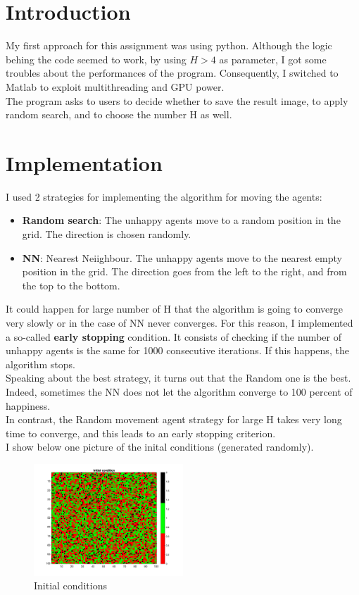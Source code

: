 \documentclass[unicode,11pt,a4paper,oneside,numbers=endperiod,openany]{scrartcl}
\begin{document}
\setassignment

\newline
\section*{Introduction}
My first approach for this assignment was using python. 
Although the logic behing the code seemed to work, by using $H>4$ as parameter, I got some 
troubles about the performances of the program. Consequently, I switched to Matlab to exploit multithreading and GPU power. \\
The program asks to users to decide whether to save the result image, to apply random search, and to choose the number H as well. 
\section*{Implementation}
I used 2 strategies for implementing the algorithm for moving the agents:
\begin{itemize}
    \item \textbf{Random search}: The unhappy agents move to a random position in the grid. The direction is chosen randomly. 
    \item \textbf{NN}: Nearest Neiighbour. The unhappy agents move to the nearest empty position in the grid. The direction goes from the left to the right, and from the top to the bottom.
\end{itemize}


It could happen for large number of H that the algorithm is going to converge very slowly or in the case of NN never converges. For this reason, I implemented a so-called \textbf{early stopping} condition. 
It consists of checking if the number of unhappy agents is the same for 1000 consecutive iterations. If this happens, the algorithm stops. \\
Speaking about the best strategy, it turns out that the Random one is the best. Indeed, sometimes the NN does not let the algorithm converge to 100 percent of happiness. \\
In contrast, the Random movement agent strategy for large H takes very long time to converge, and this leads to an early stopping criterion.\\
I show below one picture of the inital conditions (generated randomly). 
\begin{figure}[H]
    \centering
    \includegraphics[width=0.5\textwidth]{images/Initial_Condition_1.png}
    \caption{Initial conditions}
    \label{fig:image0}
\end{figure}
\end{document}
